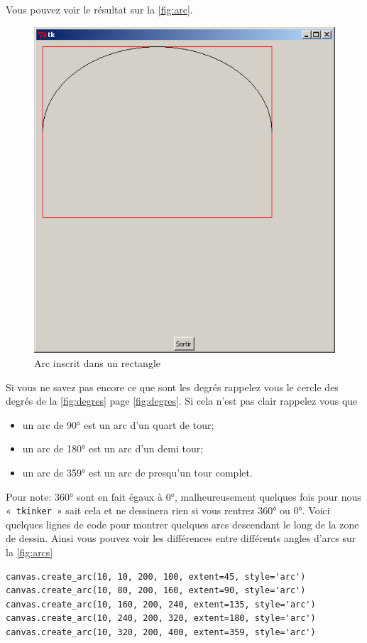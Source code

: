 Vous pouvez voir le résultat sur la \autoref{fig:arc}.
\begin{figure}[h!]
\centering
\includegraphics[scale=0.4]{images/arc}
\caption{Arc inscrit dans un rectangle}\label{fig:arc}
\end{figure}

Si vous ne savez pas encore ce que sont les degrés rappelez vous le cercle des degrés de la \autoref{fig:degres} page \autoref{fig:degres}. Si cela n'est pas clair rappelez vous que
\begin{itemize}
\item un arc de 90° est un arc d'un quart de tour;
\item un arc de 180° est un arc d'un demi tour;
\item un arc de 359° est un arc de presqu'un tour complet.
\end{itemize}

Pour note: 360° sont en fait égaux à 0°, malheureusement quelques fois pour nous «~\texttt{tkinker}~» sait cela et ne dessinera rien si vous rentrez 360° ou 0°. Voici quelques lignes de code pour montrer quelques arcs descendant le long de la zone de dessin. Ainsi vous pouvez voir les différences entre différents angles d'arcs sur la \autoref{fig:arcs}
\begin{Verbatim}[frame=single,rulecolor=\color{mbleu}, label=à taper]
canvas.create_arc(10, 10, 200, 100, extent=45, style='arc')
canvas.create_arc(10, 80, 200, 160, extent=90, style='arc')
canvas.create_arc(10, 160, 200, 240, extent=135, style='arc')
canvas.create_arc(10, 240, 200, 320, extent=180, style='arc')
canvas.create_arc(10, 320, 200, 400, extent=359, style='arc')
\end{Verbatim}

